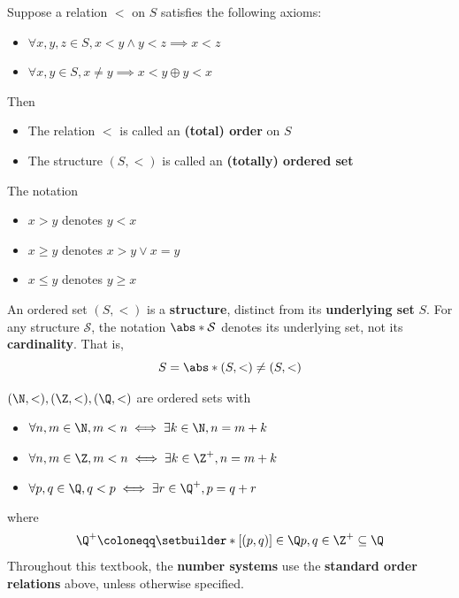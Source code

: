 \begin{definition} \label{an1:def:ordered-set}
  Suppose a relation $<$ on $S$ satisfies the following axioms:
  \begin{itemize}
    \item $\forall x, y, z \in S, x < y \land y < z \implies x < z$
    \item $\forall x, y \in S, x \neq y \implies x < y \oplus y < x$
  \end{itemize}
  Then
  \begin{itemize}
    \item The relation $<$ is called an \textbf{(total) order} on $S$
    \item The structure $(S, <)$ is called an \textbf{(totally) ordered set}
  \end{itemize}
  The notation
  \begin{itemize}
    \item $x > y$ denotes $y < x$
    \item $x \geq y$ denotes $x > y \lor x = y$
    \item $x \leq y$ denotes $y \geq x$
  \end{itemize}
\end{definition}

\begin{remark}
  An ordered set $(S, <)$ is a \textbf{structure}, distinct from its \textbf{underlying set} $S$.
  For any structure $\mathcal{S}$, the notation $\abs*{\mathcal{S}}$ denotes its underlying set,
  not its \textbf{cardinality}. That is,
  \[
    S = \abs*{(S, <)} \neq (S, <)
  \]
\end{remark}

\begin{example} \label{an1:ex:number-systems-are-ordered-sets}
  $(\N, <), (\Z, <), (\Q, <)$ are ordered sets with
  \begin{itemize}
    \item $\forall n, m \in \N, m < n \iff \exists k \in \N, n = m + k$
    \item $\forall n, m \in \Z, m < n \iff \exists k \in \Z^{+}, n = m + k$
    \item $\forall p, q \in \Q, q < p \iff \exists r \in \Q^{+}, p = q + r$
  \end{itemize}
  where
  \[
    \Q^{+} \coloneqq \setbuilder*{[(p, q)] \in \Q}{p, q \in \Z^{+}} \subseteq \Q
  \]
  Throughout this textbook, the \textbf{number systems} use the
  \textbf{standard order relations} above, unless otherwise specified.
\end{example}

